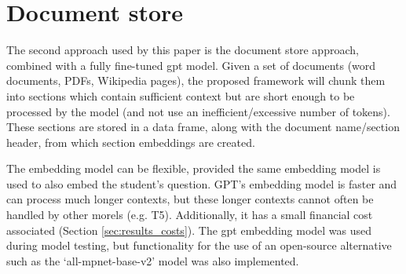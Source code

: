




\section{Document store}
The second approach used by this paper is the document store approach, combined with a fully fine-tuned \acrshort{gpt} model. Given a set of documents (word documents, PDFs, Wikipedia pages), the proposed framework will chunk them into sections which contain sufficient context but are short enough to be processed by the model (and not use an inefficient/excessive number of tokens). These sections are stored in a data frame, along with the document name/section header, from which section embeddings are created.

The embedding model can be flexible, provided the same embedding model is used to also embed the student's question. GPT's embedding model is faster and can process much longer contexts, but these longer contexts cannot often be handled by other morels (e.g. T5). Additionally, it has a small financial cost associated (Section \ref{sec:results_costs}). The \acrshort{gpt} embedding model was used during model testing, but functionality for the use of an open-source alternative such as the `all-mpnet-base-v2' model \citep{huggingface_tokeniser_model} was also implemented.

